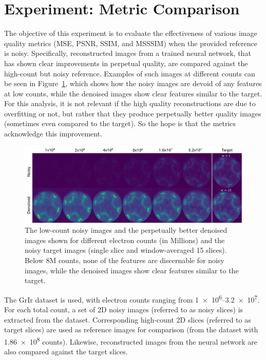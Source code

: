 \section{Experiment: Metric Comparison}\label{sec:metric_comparison_experiment}

The objective of this experiment is to evaluate the effectiveness of various image quality metrics (\gls{MSE}, \gls{PSNR}, \gls{SSIM}, and \gls{MSSSIM}) when the provided reference is noisy. Specifically, reconstructed images from a trained neural network, that has shown clear improvements in perpetual quality, are compared against the high-count but noisy reference. Examples of such images at different counts can be seen in Figure~\ref{fig:images-noisy-denoised}, which shows how the noisy images are devoid of any features at low counts, while the denoised images show clear features similar to the target. For this analysis, it is not relevant if the high quality reconstructions are due to overfitting or not, but rather that they produce perpetually better quality images (sometimes even compared to the target). So the hope is that the metrics acknowledge this improvement.

\begin{figure}[h]
    \centering
    \includegraphics[width=1\linewidth]{images/images_noisy_denoised_with_target.pdf}
    \caption{The low-count noisy images and the perpetually better denoised images shown for different electron counts (in Millions) and the noisy target images (single slice and window-averaged 15 slices). Below \num{8}M counts, none of the features are discernable for noisy images, while the denoised images show clear features similar to the target.}
    \label{fig:images-noisy-denoised}
\end{figure}

The \gls{GrIr} dataset is used, with electron counts ranging from \numrange{1e6}{3.2e7}. For each total count, a set of 2D noisy images (referred to as noisy slices) is extracted from the dataset. Corresponding high-count 2D slices (referred to as target slices) are used as reference images for comparison (from the dataset with \num{1.86e8} counts). Likewise, reconstructed images from the neural network are also compared against the target slices.

